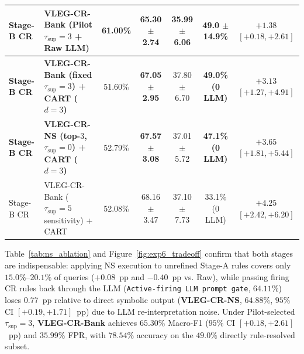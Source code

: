 \documentclass[11pt,letterpaper,onecolumn]{article}
\begin{document}
\begin{table}[tbp]
{\begin{tabular}{llccccc}
\textbf{Stage-B CR} & \textbf{VLEG-CR-Bank (Pilot $\tau_{\mathrm{sup}}{=}3$ + Raw LLM)} & \textbf{61.00\%} & \textbf{65.30 $\pm$ 2.74} & \textbf{35.99 $\pm$ 6.06} & \textbf{49.0 $\pm$ 14.9\%} & \textbf{$+1.38$ $[+0.18, +2.61]$} \\
\midrule
\textbf{Stage-B CR} & \textbf{VLEG-CR-Bank (fixed $\tau_{\mathrm{sup}}{=}3$) + CART ($d{=}3$)} & 51.60\% & \textbf{67.05 $\pm$ 2.95} & 37.80 $\pm$ 6.70 & \textbf{49.0\% (0 LLM)} & \textbf{$+3.13$ $[+1.27, +4.91]$} \\
\textbf{Stage-B CR} & \textbf{VLEG-CR-NS (top-$3$, $\tau_{\mathrm{sup}}{=}0$) + CART ($d{=}3$)} & 52.79\% & \textbf{67.57 $\pm$ 3.08} & 37.01 $\pm$ 5.72 & \textbf{47.1\% (0 LLM)} & \textbf{$+3.65$ $[+1.81, +5.44]$} \\
Stage-B CR & VLEG-CR-Bank ($\tau_{\mathrm{sup}}{=}5$ sensitivity) + CART & 52.08\% & 68.16 $\pm$ 3.47 & 37.10 $\pm$ 7.73 & 33.1\% (0 LLM) & $+4.25$ $[+2.42, +6.20]$ \\
\bottomrule
\end{tabular}}
\end{table}

Table~\ref{tab:ns_ablation} and Figure~\ref{fig:exp6_tradeoff} confirm that both stages are indispensable: applying NS execution to unrefined Stage-A rules covers only $15.0\%$--$20.1\%$ of queries ($+0.08$~pp and $-0.40$~pp vs. Raw), while passing firing CR rules back through the LLM (\texttt{Active-firing LLM prompt gate}, $64.11\%$) loses $0.77$~pp relative to direct symbolic output (\textbf{VLEG-CR-NS}, $64.88\%$, $95\%$ CI $[+0.19, +1.71]$~pp) due to LLM re-interpretation noise. Under Pilot-selected $\tau_{\mathrm{sup}}=3$, \textbf{VLEG-CR-Bank} achieves $65.30\%$ Macro-F1 ($95\%$ CI $[+0.18, +2.61]$~pp) and $35.99\%$ FPR, with $78.54\%$ accuracy on the $49.0\%$ directly rule-resolved subset.
\end{document}
